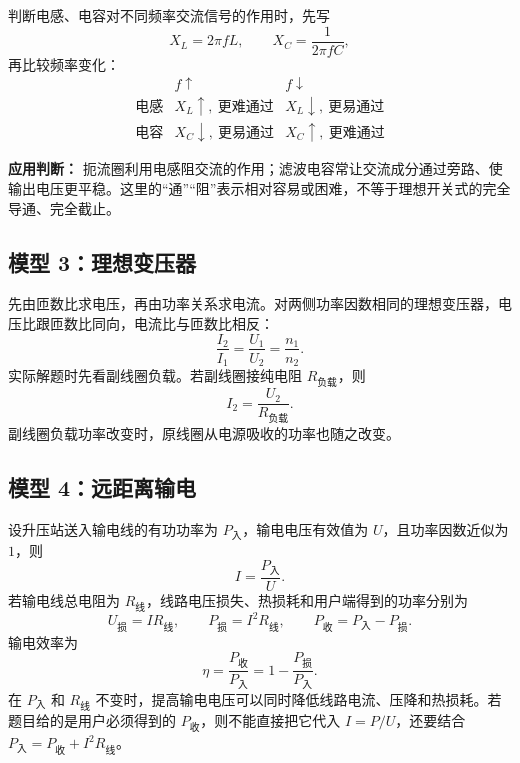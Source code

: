 判断电感、电容对不同频率交流信号的作用时，先写
\[
X_L=2\pi fL,\qquad X_C=\frac{1}{2\pi fC},
\]
再比较频率变化：
\[
\begin{array}{c|cc}
 & f\uparrow & f\downarrow\\
\hline
\text{电感} & X_L\uparrow,\ \text{更难通过} & X_L\downarrow,\ \text{更易通过}\\
\text{电容} & X_C\downarrow,\ \text{更易通过} & X_C\uparrow,\ \text{更难通过}
\end{array}
\]

\textbf{应用判断：} 扼流圈利用电感阻交流的作用；滤波电容常让交流成分通过旁路、使输出电压更平稳。这里的“通”“阻”表示相对容易或困难，不等于理想开关式的完全导通、完全截止。

\subsection*{模型 3：理想变压器}

先由匝数比求电压，再由功率关系求电流。对两侧功率因数相同的理想变压器，电压比跟匝数比同向，电流比与匝数比相反：
\[
\frac{I_2}{I_1}=\frac{U_1}{U_2}=\frac{n_1}{n_2}.
\]
实际解题时先看副线圈负载。若副线圈接纯电阻 $R_{\text{负载}}$，则
\[
I_2=\frac{U_2}{R_{\text{负载}}}.
\]
副线圈负载功率改变时，原线圈从电源吸收的功率也随之改变。

\begin{center}


\label{fig:transformer-load-response}
\end{center}

\subsection*{模型 4：远距离输电}

设升压站送入输电线的有功功率为 $P_{\text{入}}$，输电电压有效值为 $U$，且功率因数近似为 $1$，则
\[
I=\frac{P_{\text{入}}}{U}.
\]
若输电线总电阻为 $R_{\text{线}}$，线路电压损失、热损耗和用户端得到的功率分别为
\[
U_{\text{损}}=IR_{\text{线}},\qquad
P_{\text{损}}=I^2R_{\text{线}},\qquad
P_{\text{收}}=P_{\text{入}}-P_{\text{损}}.
\]
输电效率为
\[
\boxed{\eta=\frac{P_{\text{收}}}{P_{\text{入}}}
=1-\frac{P_{\text{损}}}{P_{\text{入}}}}.
\]
在 $P_{\text{入}}$ 和 $R_{\text{线}}$ 不变时，提高输电电压可以同时降低线路电流、压降和热损耗。若题目给的是用户必须得到的 $P_{\text{收}}$，则不能直接把它代入 $I=P/U$，还要结合 $P_{\text{入}}=P_{\text{收}}+I^2R_{\text{线}}$。


